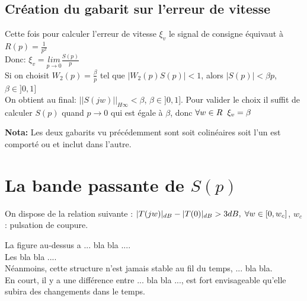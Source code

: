 \documentclass[12pt, a4paper, openany]{report}
\begin{document}
  \subsection{Création du gabarit sur l'erreur de vitesse}
  
  Cette fois pour calculer l'erreur de vitesse $\xi_{v}$ le signal de consigne équivaut à $R(p)=\frac{1}{p^{2}}$\\[0.75cm]
  Donc: \hspace{5mm} $\xi_{v}=\underset{p\longrightarrow 0}{lim}\frac{S(p)}{p}$\\[0.75cm]
  Si on choisit $W_{2}(p)=\frac{\beta}{p}$ tel que $|W_{2}(p)S(p)|<1$, alors $|S(p)|<\beta p$, $\beta \in ]0, 1]$\\[0.75cm]
  On obtient au final: \hspace{5mm} $||S(jw)||_{H\infty}<\beta$, $\beta \in ]0, 1]$. Pour valider le choix il suffit de calculer $S(p)$ quand $p\rightarrow0$ qui est égale à $\beta$, donc $\forall w \in R \hspace{2mm} \xi_{v}=\beta$ 
  
  \begin{center}
    \label{fig5}
  \end{center}
  
 \textbf{Nota:} \hspace{2mm} Les deux gabarits vu précédemment sont soit colinéaires soit l'un est comporté ou et inclut dans l'autre.\\
 
 \section{La bande passante de $S(p)$}
 On dispose de la relation suivante : \hspace{7mm} $|T(jw)|_{dB}-|T(0)|_{dB}>3dB,\hspace{1mm} \forall w\in[0, w_{c}]$, $w_{c}$: pulsation de coupure.     
  
  
 La figure au-dessus a ... bla bla ....\\
 
 Les bla bla ....\\
 
 Néanmoins, cette structure n’est jamais stable au fil du temps, ... bla bla.\\
  
 En court, il y a une différence entre ... bla bla ..., est fort envisageable qu’elle subira des changements dans le temps.
 
\end{document}

